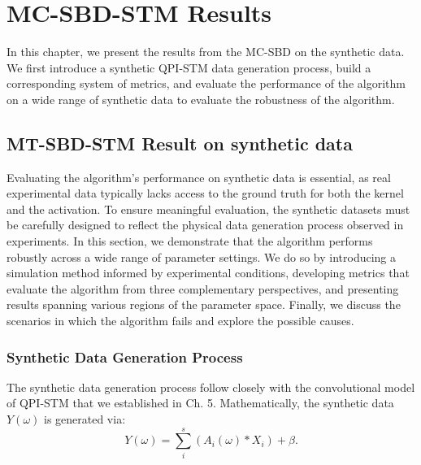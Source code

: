  \chapter{MC-SBD-STM Results}
In this chapter, we present the results from the \ac{MC-SBD} on the synthetic data. We first introduce a synthetic QPI-STM data generation process, build a corresponding system of metrics, and evaluate the performance of the algorithm on a wide range of synthetic data to evaluate the robustness of the algorithm. 

\section{MT-SBD-STM Result on synthetic data}
Evaluating the algorithm's performance on synthetic data is essential, as real experimental data typically lacks access to the ground truth for both the kernel and the activation. To ensure meaningful evaluation, the synthetic datasets must be carefully designed to reflect the physical data generation process observed in experiments. In this section, we demonstrate that the algorithm performs robustly across a wide range of parameter settings. We do so by introducing a simulation method informed by experimental conditions, developing metrics that evaluate the algorithm from three complementary perspectives, and presenting results spanning various regions of the parameter space. Finally, we discuss the scenarios in which the algorithm fails and explore the possible causes.

\subsection{Synthetic Data Generation Process}
The synthetic data generation process follow closely with the convolutional model of QPI-STM that we established in Ch. 5. Mathematically, the synthetic data $Y(\omega)$ is generated via:
\begin{equation}
	Y(\omega) = \sum_i^s ( A_i(\omega) * X_i) + \beta. 
\end{equation} 


